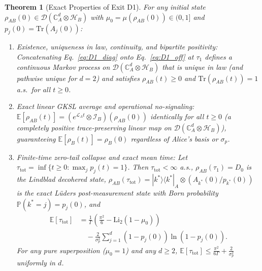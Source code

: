 \documentclass[aps,pra,10pt,twocolumn,superscriptaddress,amsmath,amssymb,floatfix]{revtex4-2}
\newtheorem{theorem}{Theorem}
\newcommand{\Tr}{\mathrm{Tr}}
\newcommand{\E}{\mathbb{E}}
\newcommand{\Prob}{\mathbb{P}}
\newcommand{\Li}{\mathrm{Li}}
\newcommand{\ketbra}[2]{|#1\rangle\langle #2|}
\begin{document}
\begin{theorem}[Exact Properties of Exit D1]
\label{thm:exitD1}
For any initial state $\rho_{AB}(0) \in \mathcal{D}(\mathbb{C}^d_A \otimes \mathcal{H}_B)$ with $\mu_0 = \mu(\rho_{AB}(0)) \in (0, 1]$ and $p_j(0) = \Tr(A_j(0))$:
\begin{enumerate}
\item[(a)] \emph{Existence, uniqueness in law, continuity, and bipartite positivity:} Concatenating Eq.~\eqref{eq:D1_diag} onto Eq.~\eqref{eq:D1_off} at $\tau_1$ defines a continuous Markov process on $\mathcal{D}(\mathbb{C}^d_A \otimes \mathcal{H}_B)$ that is unique in law (and pathwise unique for $d=2$) and satisfies $\rho_{AB}(t) \ge 0$ and $\Tr(\rho_{AB}(t)) = 1$ a.s.\ for all $t \ge 0$.
\item[(b)] \emph{Exact linear GKSL average and operational no-signaling:} $\E[\rho_{AB}(t)] = (e^{\mathcal{L}_A t} \otimes \mathcal{I}_B)(\rho_{AB}(0))$ identically for all $t \ge 0$ (a completely positive trace-preserving linear map on $\mathcal{D}(\mathbb{C}^d_A \otimes \mathcal{H}_B)$), guaranteeing $\E[\rho_B(t)] = \rho_B(0)$ regardless of Alice's basis or $\sigma_p$.
\item[(c)] \emph{Finite-time zero-tail collapse and exact mean time:} Let $\tau_{\mathrm{tot}} = \inf\{t \ge 0 : \max_j p_j(t) = 1\}$. Then $\tau_{\mathrm{tot}} < \infty$ a.s., $\rho_{AB}(\tau_1) = D_0$ is the Lindblad decohered state, $\rho_{AB}(\tau_{\mathrm{tot}}) = \ketbra{k^*}{k^*}_A \otimes (A_{k^*}(0)/p_{k^*}(0))$ is the exact L\"uders post-measurement state with Born probability $\Prob(k^* = j) = p_j(0)$, and
\begin{align}
\label{eq:exact_tau}
\E[\tau_{\mathrm{tot}}] &= \frac{1}{\Gamma}\!\left(\frac{\pi^2}{6} - \Li_2(1-\mu_0)\right) \nonumber\\
&\quad - \frac{2}{\sigma_p^2}\sum_{j=1}^d (1-p_j(0))\ln(1-p_j(0)).
\end{align}
For any pure superposition ($\mu_0=1$) and any $d \ge 2$, $\E[\tau_{\mathrm{tot}}] \le \frac{\pi^2}{6\Gamma} + \frac{2}{\sigma_p^2}$ uniformly in $d$.
\end{enumerate}
\end{theorem}
\end{document}

